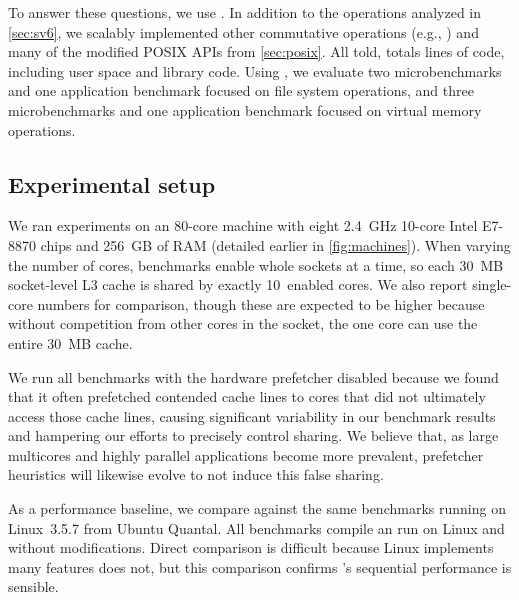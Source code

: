 To answer these questions, we use \sys.
In addition to the operations analyzed in \cref{sec:sv6}, we scalably
implemented
other commutative operations (e.g., )
and many of the modified POSIX APIs from
\cref{sec:posix}.
%
All told, \sys
totals  lines of code, including user
space and library code.
%
Using \sys, we evaluate two microbenchmarks and one application
benchmark focused on file system operations, and three microbenchmarks
and one application benchmark focused on virtual memory operations.


\subsection{Experimental setup}
\label{sec:topic:ben}


We ran experiments on an 80-core machine with eight 2.4~GHz 10-core
Intel E7-8870 chips and 256~GB of RAM (detailed earlier in
\cref{fig:machines}).
%
When varying the number of
cores, benchmarks enable whole sockets at a time, so each 30~MB
socket-level L3 cache is shared by exactly 10~enabled cores.
We also report single-core numbers for
comparison, though these are expected to be higher because without
competition from other cores in the socket, the one
core can use the entire 30~MB cache.

We run all benchmarks with the hardware prefetcher disabled because we
found that it often prefetched contended cache lines to cores that did
not ultimately access those cache lines, causing significant
variability in our benchmark results and hampering our efforts to
precisely control sharing.  We believe that, as large multicores and
highly parallel applications become more prevalent, prefetcher
heuristics will likewise evolve to not induce this false sharing.

As a performance baseline, we compare against the same
benchmarks running on Linux~3.5.7 from Ubuntu Quantal.
%
All benchmarks compile an run on Linux and \sys without modifications.
%
Direct comparison is difficult because
Linux implements many features \sys does not, but this comparison
confirms \sys's sequential performance is sensible.

